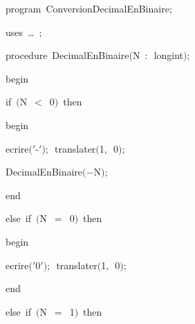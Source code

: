 
{
\parindent {}
\medskip

\carrenoir
\vspace{\neglskip}\mbox{\blc  \idt  \mcl program\idt\ ConversionDecimalEnBinaire$;$
}\par 
\vspace{\neglskip}\mbox{\blc \blk\idt \mcl uses\idt \ \ldots\ $;$
}\par 
\medskip

\pagebreak[3] 
\vspace{\neglskip}\mbox{\blc  \blk\idt  \mcl procedure\idt \ DecimalEnBinaire$($N\ $:$\ longint$)$$;$}\par 
\vspace{\neglskip}\mbox{\blc  \blk\idt  \mcl begin\idt }\par 
\pagebreak[3] 
\vspace{\neglskip}\mbox{\blc  \blk\blk\idt  \mcl if\idt \ $($N\ $<$\ 0$)$\ \mcl then\idt }\par 
\vspace{\neglskip}\mbox{\blc  \blk\blk\blk\idt  \mcl begin\idt }\par 
\vspace{\neglskip}\mbox{\blc  \blk\blk\blk\blk\idt  ecrire$($\cha $\scriptstyle '$-\idt $\scriptstyle '$$)$$;$\ translater$($1$,$\ 0$)$$;$}\par 
\vspace{\neglskip}\mbox{\blc  \blk\blk\blk\blk\idt  DecimalEnBinaire$($$-$N$)$$;$}\par 
\vspace{\neglskip}\mbox{\blc  \blk\blk\blk\idt  \mcl end\idt }\par 
\pagebreak[3] 
\vspace{\neglskip}\mbox{\blc  \blk\blk\idt  \mcl else\idt \ \mcl if\idt \ $($N\ $=$\ 0$)$\ \mcl then\idt }\par 
\vspace{\neglskip}\mbox{\blc  \blk\blk\blk\idt  \mcl begin\idt }\par 
\vspace{\neglskip}\mbox{\blc  \blk\blk\blk\blk\idt  ecrire$($\cha $\scriptstyle '$0\idt $\scriptstyle '$$)$$;$\ translater$($1$,$\ 0$)$$;$}\par 
\vspace{\neglskip}\mbox{\blc  \blk\blk\blk\idt  \mcl end\idt }\par 
\pagebreak[3] 
\vspace{\neglskip}\mbox{\blc  \blk\blk\idt  \mcl else\idt \ \mcl if\idt \ $($N\ $=$\ 1$)$\ \mcl then\idt }\par 
}

